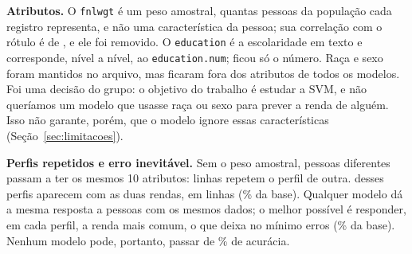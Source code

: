 \textbf{Atributos.} O \texttt{fnlwgt} é um peso amostral, quantas pessoas da população cada registro representa, e não uma característica da pessoa; sua correlação com o rótulo é de \svCorrFnlwgt, e ele foi removido. O \texttt{education} é a escolaridade em texto e corresponde, nível a nível, ao \texttt{education.num}; ficou só o número. Raça e sexo foram mantidos no arquivo, mas ficaram fora dos atributos de todos os modelos. Foi uma decisão do grupo: o objetivo do trabalho é estudar a SVM, e não queríamos um modelo que usasse raça ou sexo para prever a renda de alguém. Isso não garante, porém, que o modelo ignore essas características (Seção~\ref{sec:limitacoes}).

\textbf{Perfis repetidos e erro inevitável.} Sem o peso amostral, pessoas diferentes passam a ter os mesmos 10 atributos: \svRepetemPerfil{} linhas repetem o perfil de outra. \svPerfisConflito{} desses perfis aparecem com as duas rendas, em \svLinhasConflito{} linhas (\svPctConflito\% da base). Qualquer modelo dá a mesma resposta a pessoas com os mesmos dados; o melhor possível é responder, em cada perfil, a renda mais comum, o que deixa no mínimo \svErrosIrred{} erros (\svIrredPct\% da base). Nenhum modelo pode, portanto, passar de \svTeto\% de acurácia.
